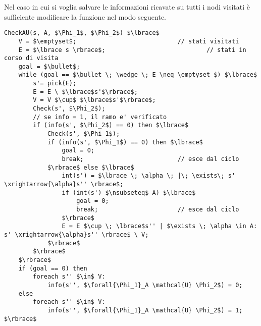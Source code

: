 Nel caso in cui si voglia salvare le informazioni ricavate su tutti i nodi visitati è sufficiente modificare la funzione nel modo seguente.
\\
\begin{lstlisting}[mathescape]
CheckAU(s, A, $\Phi_1$, $\Phi_2$) $\lbrace$
	V = $\emptyset$; 							// stati visitati
	E = $\lbrace s \rbrace$; 							// stati in corso di visita
	goal = $\bullet$;
	while (goal == $\bullet \; \wedge \; E \neq \emptyset $) $\lbrace$
		s'= pick(E);
		E = E \ $\lbrace$s'$\rbrace$;
		V = V $\cup$ $\lbrace$s'$\rbrace$;
		Check(s', $\Phi_2$);
		// se info = 1, il ramo e' verificato
		if (info(s', $\Phi_2$) == 0) then $\lbrace$
			Check(s', $\Phi_1$);
			if (info(s', $\Phi_1$) == 0) then $\lbrace$
				goal = 0;
				break;							// esce dal ciclo
			$\rbrace$ else $\lbrace$
				int(s') = $\lbrace \; \alpha \; |\; \exists\; s' \xrightarrow{\alpha}s'' \rbrace$;
				if (int(s') $\nsubseteq$ A) $\lbrace$
					goal = 0;
					break;						// esce dal ciclo
				$\rbrace$
				E = E $\cup \; \lbrace$s'' | $\exists \; \alpha \in A: s' \xrightarrow{\alpha}s'' \rbrace$ \ V;
			$\rbrace$	
		$\rbrace$
	$\rbrace$
	if (goal == 0) then
		foreach s'' $\in$ V:
			info(s'', $\forall{\Phi_1}_A \mathcal{U} \Phi_2$) = 0;
	else
		foreach s'' $\in$ V:
			info(s'', $\forall{\Phi_1}_A \mathcal{U} \Phi_2$) = 1;
$\rbrace$
\end{lstlisting}